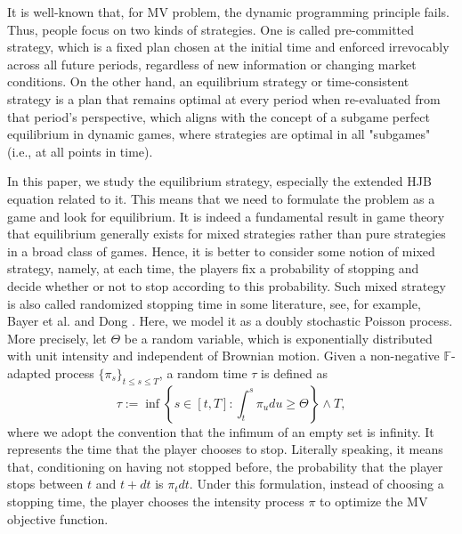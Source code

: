 \documentclass[11pt]{article}
\begin{document}
It is well-known that, for  MV problem, the dynamic programming principle fails. Thus, people focus on two kinds of strategies. One is called pre-committed  strategy, which is a fixed plan chosen at the initial time and enforced irrevocably across all future periods, regardless of new information or changing market conditions.  On the other hand, an equilibrium strategy or time-consistent strategy is a plan that remains optimal at every period when re-evaluated from that period's perspective, which aligns with the concept of a subgame perfect equilibrium in dynamic games, where strategies are optimal in all "subgames" (i.e., at all points in time).


In this paper, we  study the equilibrium strategy, especially the extended HJB equation related to it.  This means that we need  to formulate the problem as a game and look for equilibrium.   It is indeed a fundamental result in game theory that equilibrium generally exists for mixed strategies rather than pure strategies in a broad class of games. Hence, it is better to consider  some notion of mixed strategy, namely, at each time, the players fix a probability of stopping and decide whether or not to stop according to this probability.  Such  mixed strategy is also called randomized stopping time in some literature, see, for example, Bayer et al. \cite{bayer2021randomized} and Dong \cite{dong2024randomized}. Here, we  model it as a doubly stochastic Poisson process. More precisely, let $\Theta$  be a random variable, which is exponentially distributed with unit intensity and independent of Brownian motion. Given a non-negative $\mathbb F$-adapted process $\{ \pi_s\}_{t\le s\le T}$, a random time $\tau$ is defined as 
$$
\tau:= \inf \left\{ s\in [t,T]: \int_t^s \pi_u du \ge \Theta\right\}  {\wedge} T,
$$
where we adopt the convention that the infimum of an empty set is infinity.   It represents the time that the player chooses to stop. Literally speaking,   it means that, conditioning on having not stopped before, the probability that  the player stops between $t$ and $t+dt$ is $\pi_t dt$.  Under this formulation, instead of choosing a  stopping time, the player  chooses the  intensity process $\pi$ to  optimize the  MV objective function. 
\end{document}
